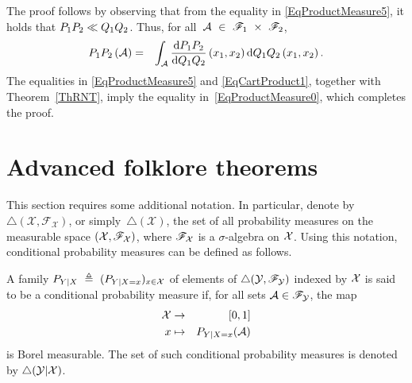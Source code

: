 \documentclass[lettersize,onecolumn]{IEEEtran}
\begin{document}
\begin{IEEEproof}
The proof follows by observing that from the equality in \eqref{EqProductMeasure5}, it holds that ${P_1P_2}\ll{Q_1Q_2}$. Thus, for all~$\mathcal A~\in~\mathscr{F}_1~\times~\mathscr{F}_2$, 
\begin{eqnarray}
P_{1} P_{2}\left(\mathcal A\right) 
\label{EqCartProduct1}
&=& \int_{\mathcal A} \dfrac{\mathrm{d}P_{1} P_{2}}{\mathrm{d}Q_1Q_2}\left(x_1, x_2\right) \mathrm{d}Q_1Q_2\left(x_1, x_2\right).
\end{eqnarray}
%
The equalities in \eqref{EqProductMeasure5} and \eqref{EqCartProduct1}, together with Theorem~\ref{ThRNT}, imply the equality in~\eqref{EqProductMeasure0}, which completes the proof.
%
\end{IEEEproof}

\section{Advanced folklore theorems}
This section requires some additional notation. In particular, denote by $\triangle\left(\mathcal{X},\mathscr{F}_\mathcal{X}\right)$, or simply~$\triangle\left(\mathcal{X}\right)$, the set of all probability measures on the measurable space $\left(\mathcal{X},\mathscr{F}_{\mathcal X}\right)$, where $\mathscr{F}_{\mathcal X}$ is a $\sigma$-algebra on $\mathcal X$.
%
Using this notation, conditional probability measures can be defined as follows. 
\begin{definition}
A family $P_{Y|X}~\triangleq~(P_{Y|X=x})_{x\in\mathcal X}$ of elements of $\triangle( \mathcal Y, \mathscr{F}_{\mathcal Y})$ indexed by $\mathcal X$ is said to be a conditional probability measure if, for all sets $\mathcal{A} \in \mathscr{F}_{\mathcal Y}$, the map
\begin{eqnarray}
\mathcal X& \to & [0, 1] \\
x & \mapsto & P_{Y|X=x}(\mathcal{A})
\end{eqnarray}
is Borel measurable. The set of such conditional probability measures is denoted by $\triangle(\mathcal Y|\mathcal X)$.
\end{definition}
\end{document}
